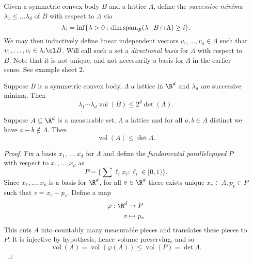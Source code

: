 \documentclass[a4paper]{article}
\begin{document}
Given a symmetric convex body \(B\) and a lattice \(\Lambda\), define the \emph{successive minima} \(\lambda_1 \leq \dots \lambda_d\) of \(B\) with respect to \(\Lambda\) via
\[
  \lambda_i = \inf \{\lambda > 0: \dim \text{span}_\R(\lambda \cdot B \cap \Lambda) \geq i\}.
\]
We may then inductively define linear independent vectors \(v_1, \dots, v_d \in \Lambda\) such that \(v_1, \dots, v_i \in \lambda_i \cl B\). Will call such a set a \emph{directional basis} for \(\Lambda\) with respect to \(B\). Note that it is not unique, and not necessarily a basis for \(\Lambda\) in the earlier sense. See example sheet 2.

\begin{theorem}
  Suppose \(B\) is a symmetric convex body, \(\Lambda\) a lattice in \(\R^d\) and \(\lambda_d\) are successive minima. Then
  \[
    \lambda_1 \cdots \lambda_d \operatorname{vol}(B) \leq 2^d \det(\Lambda).
  \]
\end{theorem}

\begin{lemma}[lemma 6.3][Blichfeldt]
  Suppose \(A \subseteq \R^d\) is a measurable set, \(\Lambda\) a lattice and for all \(a, b \in A\) distinct we have \(a - b \notin \Lambda\). Then
  \[
    \operatorname{vol}(A) \leq \det \Lambda.
  \]
\end{lemma}

\begin{proof}
  Fix a basis \(x_1, \dots, x_d\) for \(\Lambda\) and define the \emph{fundamental parallelopiped} \(P\) with respect to \(x_1, \dots, x_d\) as
  \[
    P = \{\sum \ell_i x_i: \ell_i \in [0, 1)\}.
  \]
  Since \(x_1, \dots, x_d\) is a basis for \(\R^d\), for all \(v \in \R^d\) there exists unique \(x_v \in \Lambda, p_v \in P\) such that \(v = x_v + p_v\). Define a map
  \begin{align*}
    \varphi: \R^d &\to P \\
    v &\mapsto p_v
  \end{align*}
  This cuts \(A\) into countably many measurable pieces and translates these pieces to \(P\). It is injective by hypothesis, hence volume preserving, and so
  \[
    \operatorname{vol}(A) = \operatorname{vol}(\varphi(A)) \leq \operatorname{vol}(P) = \det \Lambda.
  \]
\end{proof}
\end{document}
